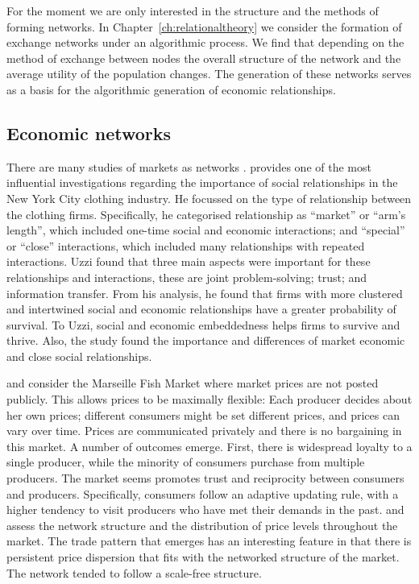 For the moment we are only interested in the structure and the methods of forming networks. In Chapter~\ref{ch:relationaltheory} we consider the formation of exchange networks under an algorithmic process. We find that depending on the method of exchange between nodes the overall structure of the network and the average utility of the population changes. The generation of these networks serves as a basis for the algorithmic generation of economic relationships.

\subsection{Economic networks}

There are many studies of markets as networks \citep{RauchCasella2001}. \citet{Uzzi1996} provides one of the most influential investigations regarding the importance of social relationships in the New York City clothing industry. He focussed on the type of relationship between the clothing firms. Specifically, he categorised relationship as ``market'' or ``arm's length'', which included one-time social and economic interactions; and ``special'' or ``close'' interactions, which included many relationships with repeated interactions. Uzzi found that three main aspects were important for these relationships and interactions, these are joint problem-solving; trust; and information transfer. From his analysis, he found that firms with more clustered and intertwined social and economic relationships have a greater probability of survival. To Uzzi, social and economic embeddedness helps firms to survive and thrive. Also, the study found the importance and differences of market economic and close social relationships.

\citet{Weisbuch2000} and \citet{KirmanVriend2001} consider the Marseille Fish Market where market prices are not posted publicly. This allows prices to be maximally flexible: Each producer decides about her own prices; different consumers might be set different prices, and prices can vary over time. Prices are communicated privately and there is no bargaining in this market. A number of outcomes emerge. First, there is widespread loyalty to a single producer, while the minority of consumers purchase from multiple producers. The market seems promotes trust and reciprocity between consumers and producers. Specifically, consumers follow an adaptive updating rule, with a higher tendency to visit producers who have met their demands in the past. \citet{Vignes1993} and \citet{VignesEtienne2011} assess the network structure and the distribution of price levels throughout the market. The trade pattern that emerges has an interesting feature in that there is persistent price dispersion that fits with the networked structure of the market. The network tended to follow a scale-free structure.

